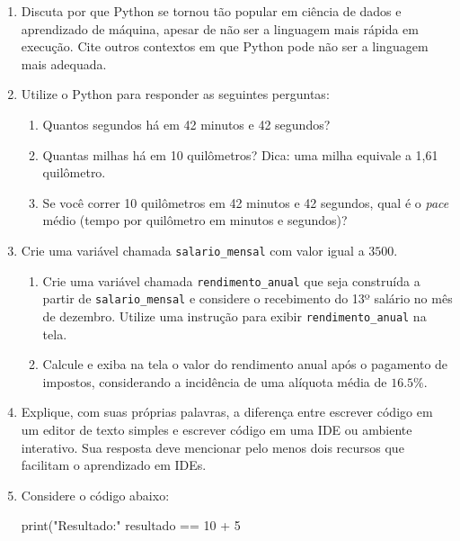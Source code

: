 \documentclass[
  brazilian,
  letterpaper,
  DIV=11,
  numbers=noendperiod]{scrreprt}
\newenvironment{Shaded}{\begin{snugshade}}{\end{snugshade}}
\newcommand{\BuiltInTok}[1]{\textcolor[rgb]{0.00,0.23,0.31}{#1}}
\newcommand{\DecValTok}[1]{\textcolor[rgb]{0.68,0.00,0.00}{#1}}
\newcommand{\NormalTok}[1]{\textcolor[rgb]{0.00,0.23,0.31}{#1}}
\newcommand{\OperatorTok}[1]{\textcolor[rgb]{0.37,0.37,0.37}{#1}}
\newcommand{\StringTok}[1]{\textcolor[rgb]{0.13,0.47,0.30}{#1}}
\providecommand{\tightlist}{%
  \setlength{\itemsep}{0pt}\setlength{\parskip}{0pt}}
\begin{document}
\begin{enumerate}
\def\labelenumi{\arabic{enumi}.}
\item
  Discuta por que Python se tornou tão popular em ciência de dados e
  aprendizado de máquina, apesar de não ser a linguagem mais rápida em
  execução. Cite outros contextos em que Python pode não ser a linguagem
  mais adequada.
\item
  Utilize o Python para responder as seguintes perguntas:

  \begin{enumerate}
  \def\labelenumii{\alph{enumii}.}
  \tightlist
  \item
    Quantos segundos há em 42 minutos e 42 segundos?
  \item
    Quantas milhas há em 10 quilômetros? Dica: uma milha equivale a 1,61
    quilômetro.
  \item
    Se você correr 10 quilômetros em 42 minutos e 42 segundos, qual é o
    \emph{pace} médio (tempo por quilômetro em minutos e segundos)?
  \end{enumerate}
\item
  Crie uma variável chamada \texttt{salario\_mensal} com valor igual a
  \(3500\).

  \begin{enumerate}
  \def\labelenumii{\alph{enumii}.}
  \tightlist
  \item
    Crie uma variável chamada \texttt{rendimento\_anual} que seja
    construída a partir de \texttt{salario\_mensal} e considere o
    recebimento do 13º salário no mês de dezembro. Utilize uma instrução
    para exibir \texttt{rendimento\_anual} na tela.
  \item
    Calcule e exiba na tela o valor do rendimento anual após o pagamento
    de impostos, considerando a incidência de uma alíquota média de
    \(16.5\%\).
  \end{enumerate}
\item
  Explique, com suas próprias palavras, a diferença entre escrever
  código em um editor de texto simples e escrever código em uma IDE ou
  ambiente interativo. Sua resposta deve mencionar pelo menos dois
  recursos que facilitam o aprendizado em IDEs.
\item
  Considere o código abaixo:

\begin{Shaded}
\begin{Highlighting}[]
\BuiltInTok{print}\NormalTok{(}\StringTok{"Resultado:"}
\NormalTok{resultado }\OperatorTok{==} \DecValTok{10} \OperatorTok{+} \DecValTok{5}
\end{Highlighting}
\end{Shaded}


\end{enumerate}
\end{document}
